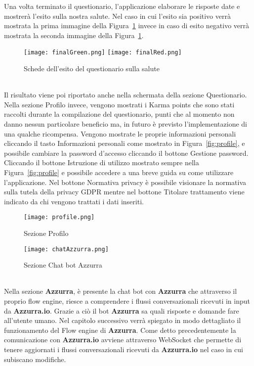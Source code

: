 \begin{trivlist}
	Una volta terminato il questionario, l'applicazione elaborare le risposte date e mostrerà l'esito sulla nostra salute. Nel caso in cui l'esito sia positivo verrà mostrata la prima immagine della Figura~\ref{fig:quefinal} invece in caso di esito negativo verrà mostrata la seconda immagine della Figura~\ref{fig:quefinal}.
	\begin{figure}[h]
		\begin{center}
			\texttt{[image: finalGreen.png]}
			\texttt{[image: finalRed.png]}
			\caption{Schede dell'esito del questionario sulla salute}\label{fig:quefinal}
		\end{center}
	\end{figure}\\
	Il risultato viene poi riportato anche nella schermata della sezione Questionario.
	\\
	Nella sezione Profilo invece, vengono mostrati i Karma points che sono stati raccolti durante la compilazione del questionario, punti che al momento non danno nessun particolare beneficio ma, in futuro è previsto l'implementazione di una qualche ricompensa. Vengono mostrate le proprie informazioni personali cliccando il tasto Informazioni personali come mostrato in Figura~\ref{fig:profile}, e possibile cambiare la password d'accesso cliccando il bottone Gestione password. Cliccando il bottone Istruzione di utilizzo mostrato sempre nella Figura~\ref{fig:profile} e possibile accedere a una breve guida su come utilizzare l'applicazione. Nel bottone Normativa privacy è possibile visionare la normativa sulla tutela della privacy GDPR mentre nel bottone Titolare trattamento viene indicato da chi vengono trattati i dati inseriti.
	\begin{figure}[h]
		\begin{center}
			\texttt{[image: profile.png]}
			\caption{Sezione Profilo}\label{fig:profile}
			\texttt{[image: chatAzzurra.png]}
			\caption{Sezione Chat bot Azzurra}\label{fig:Azzurra}
		\end{center}
	\end{figure}\\
	Nella sezione \textbf{Azzurra}, è presente la chat bot con \textbf{Azzurra} che attraverso il proprio flow engine, riesce a comprendere i flussi conversazionali ricevuti in input da \textbf{Azzurra.io}. Grazie a ciò il bot \textbf{Azzurra} sa quali risposte e domande fare all'utente umano. Nel capitolo successivo verrà spiegato in modo dettagliato il funzionamento del Flow engine di \textbf{Azzurra}. Come detto precedentemente la comunicazione con \textbf{Azzurra.io} avviene attraverso WebSocket che permette di tenere aggiornati i flussi conversazionali ricevuti da \textbf{Azzurra.io} nel caso in cui subiscano modifiche.	
	
\end{trivlist}
